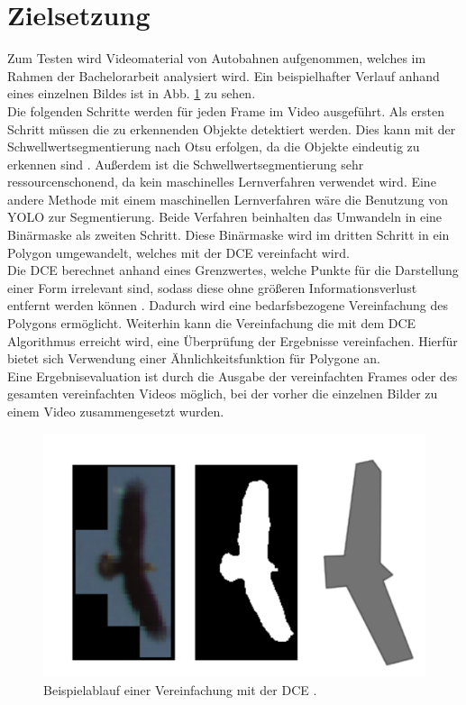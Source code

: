 \section{Zielsetzung}{
Zum Testen wird Videomaterial von Autobahnen aufgenommen, welches im Rahmen der Bachelorarbeit analysiert wird. Ein beispielhafter Verlauf anhand eines einzelnen Bildes ist in Abb. \ref{Bsp_Dorr} zu sehen. \\
Die folgenden Schritte werden für jeden Frame im Video ausgeführt. 
Als ersten Schritt müssen die zu erkennenden Objekte detektiert werden. Dies kann mit der Schwellwertsegmentierung nach Otsu erfolgen, da die Objekte eindeutig zu erkennen sind \citep{Otsu1979}. Außerdem ist die Schwellwertsegmentierung sehr ressourcenschonend, da kein maschinelles Lernverfahren verwendet wird. Eine andere Methode mit einem maschinellen Lernverfahren wäre die Benutzung von YOLO zur Segmentierung. Beide Verfahren beinhalten das Umwandeln in eine Binärmaske als zweiten Schritt. Diese Binärmaske wird im dritten Schritt in ein Polygon umgewandelt, welches mit der DCE vereinfacht wird. \\
Die DCE berechnet anhand eines Grenzwertes, welche Punkte für die Darstellung einer Form irrelevant sind, sodass diese ohne größeren Informationsverlust entfernt werden können \citep{Barkowsky2000}. Dadurch wird eine bedarfsbezogene Vereinfachung des Polygons ermöglicht. 
Weiterhin kann die Vereinfachung die mit dem DCE Algorithmus erreicht wird, eine Überprüfung der Ergebnisse vereinfachen. Hierfür bietet sich Verwendung einer Ähnlichkeitsfunktion für Polygone an. \\
Eine Ergebnisevaluation ist durch die Ausgabe der vereinfachten Frames  oder des gesamten vereinfachten Videos möglich, bei der vorher die einzelnen Bilder zu einem Video zusammengesetzt wurden. \\}
\begin{figure}[ht]
	\vspace{-0.5cm}
	   \centering
	   \includegraphics*[scale = 0.5, keepaspectratio, trim=2 2 2 2 ]{images/Example_bird.png}
	   \caption[Beispielablauf der Segmentierung und DCE aus \citet{Dorr2017}]{Beispielablauf einer Vereinfachung mit der DCE \citep{Dorr2017}.}
	   \label{Bsp_Dorr}
   \end{figure}
